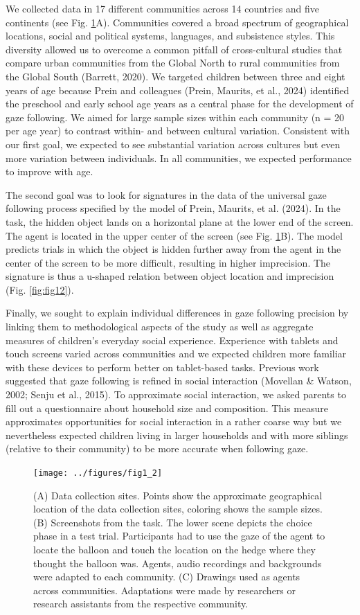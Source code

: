 \documentclass[
  man,floatsintext]{apa7}
\begin{document}
We collected data in 17 different communities across 14 countries and five continents (see Fig. \ref{fig:fig1}A). Communities covered a broad spectrum of geographical locations, social and political systems, languages, and subsistence styles. This diversity allowed us to overcome a common pitfall of cross-cultural studies that compare urban communities from the Global North to rural communities from the Global South (Barrett, 2020). We targeted children between three and eight years of age because Prein and colleagues (Prein, Maurits, et al., 2024) identified the preschool and early school age years as a central phase for the development of gaze following. We aimed for large sample sizes within each community (n = 20 per age year) to contrast within- and between cultural variation. Consistent with our first goal, we expected to see substantial variation across cultures but even more variation between individuals. In all communities, we expected performance to improve with age.

The second goal was to look for signatures in the data of the universal gaze following process specified by the model of Prein, Maurits, et al. (2024). In the task, the hidden object lands on a horizontal plane at the lower end of the screen. The agent is located in the upper center of the screen (see Fig. \ref{fig:fig1}B). The model predicts trials in which the object is hidden further away from the agent in the center of the screen to be more difficult, resulting in higher imprecision. The signature is thus a u-shaped relation between object location and imprecision (Fig. \ref{fig:fig12}).

Finally, we sought to explain individual differences in gaze following precision by linking them to methodological aspects of the study as well as aggregate measures of children's everyday social experience. Experience with tablets and touch screens varied across communities and we expected children more familiar with these devices to perform better on tablet-based tasks. Previous work suggested that gaze following is refined in social interaction (Movellan \& Watson, 2002; Senju et al., 2015). To approximate social interaction, we asked parents to fill out a questionnaire about household size and composition. This measure approximates opportunities for social interaction in a rather coarse way but we nevertheless expected children living in larger households and with more siblings (relative to their community) to be more accurate when following gaze.

\begin{figure}
\texttt{[image: ../figures/fig1\_2]} \caption{(A) Data collection sites. Points show the approximate geographical location of the data collection sites, coloring shows the sample sizes. (B) Screenshots from the task. The lower scene depicts the choice phase in a test trial. Participants had to use the gaze of the agent to locate the balloon and touch the location on the hedge where they thought the balloon was. Agents, audio recordings and backgrounds were adapted to each community. (C) Drawings used as agents across communities. Adaptations were made by researchers or research assistants from the respective community.}\label{fig:fig1}
\end{figure}
\end{document}

